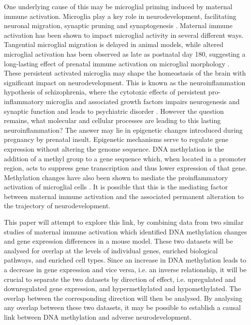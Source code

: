 \documentclass{bioinfo}
\begin{document}
\begin{introduction}
One underlying cause of this may be microglial priming induced by maternal immune activation. Microglia play a key role in neurodevelopment, facilitating neuronal migration, synaptic pruning and synaptogenesis \citep{}. Maternal immune activation has been shown to impact microglial activity in several different ways. Tangential microglial migration is delayed in animal models, while altered microglial activation has been observed as late as postnatal day 180, suggesting a long-lasting effect of prenatal immune activation on microglial morphology \citep{van_den_eynde_hypolocomotive_2014, zhang_maternal_2018}. These persistent activated microglia may shape the homeostasis of the brain with significant impact on neurodevelopment. This is known as the neuroinflammation hypothesis of schizophrenia, where the cytotoxic effects of persistent pro-inflammatory microglia and associated growth factors impairs neurogenesis and synaptic function and leads to psychiatric disorder \citep{laskaris_microglial_2016, monji_cytokines_2009}. However the question remains, what molecular and cellular processes are leading to this lasting neuroinflammation? The answer may lie in epigenetic changes introduced during pregnancy by prenatal insult. Epigenetic mechanisms serve to regulate gene expression without altering the genome sequence. DNA methylation is the addition of a methyl group to a gene sequence which, when located in a promoter region, acts to suppress gene transcription and thus lower expression of that gene. Methylation changes have also been shown to mediate the proinflammatory activation of microglial cells \citep{carrillo-jimenez_tet2_2019}. It is possible that this is the mediating factor between maternal immune activation and the associated permanent alteration to the trajectory of neurodevelopment. 

This paper will attempt to explore this link, by combining data from two similar studies of maternal immune activation which identified DNA methylation changes and gene expression differences in a mouse model. These two datasets will be analysed for overlap at the levels of individual genes, enriched biological pathways, and enriched cell types. Since an increase in DNA methylation leads to a decrease in gene expression and vice versa, i.e. an inverse relationship, it will be crucial to separate the two datasets by direction of effect, i.e. upregulated and downregulated gene expression, and hypermethylated and hypomethylated. The overlap between the corresponding direction will then be analysed. By analysing any overlap between these two datasets, it may be possible to establish a causal link between DNA methylation and adverse neurodevelopment.

\end{introduction}
\end{document}
